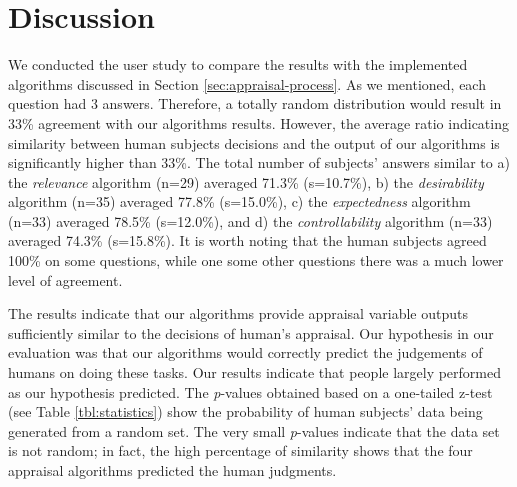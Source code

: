 \documentclass{article}
\begin{document}
% 

\vspace{-3mm}
\section{Discussion}
\vspace{-1mm}
We conducted the user study to compare the results with the implemented
algorithms discussed in Section \ref{sec:appraisal-process}. As we mentioned,
each question had 3 answers. Therefore, a totally random distribution would
result in 33\% agreement with our algorithms results. However, the average
ratio indicating similarity between human subjects decisions and the output of
our algorithms is significantly higher than 33\%. The total number of subjects'
answers similar to a) the \textit{relevance} algorithm (n=29) averaged 71.3\%
(s=10.7\%), b) the \textit{desirability} algorithm (n=35) averaged 77.8\%
(s=15.0\%), c) the \textit{expectedness} algorithm (n=33) averaged 78.5\%
(s=12.0\%), and d) the \textit{controllability} algorithm (n=33) averaged 74.3\%
(s=15.8\%). It is worth noting that the human subjects agreed 100\% on some
questions, while one some other questions there was a much lower level of
agreement.

The results indicate that our algorithms provide appraisal variable outputs
sufficiently similar to the decisions of human's appraisal. Our hypothesis in
our evaluation was that our algorithms would correctly predict the judgements of
humans on doing these tasks. Our results indicate that people largely performed
as our hypothesis predicted. The \textit{p}-values obtained based on a
one-tailed z-test (see Table \ref{tbl:statistics}) show the probability of human
subjects' data being generated from a random set. The very small
\textit{p}-values indicate that the data set is not random; in fact, the high
percentage of similarity shows that the four appraisal algorithms predicted the
human judgments.
\end{document}
